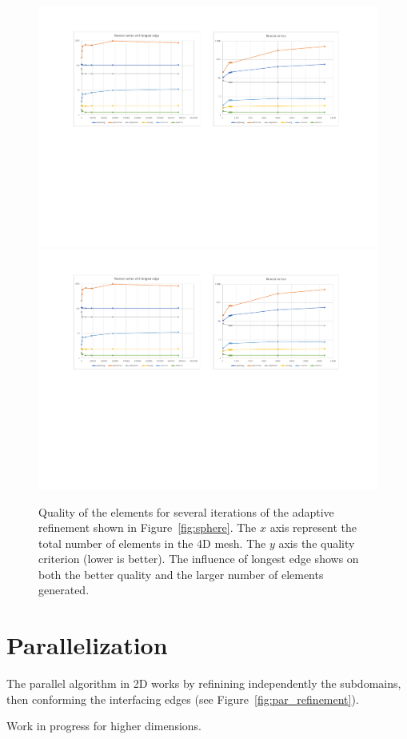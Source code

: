 \documentclass{article}
\begin{document}
\begin{figure}[htbp]
	\centering
	\includegraphics[width=0.48\linewidth]{figures/NewestVertex_Recursive} \hfill
	\includegraphics[width=0.48\linewidth]{figures/NewestVertex_and_LongestEdge_Recursive} 

	\caption{Quality of the elements for several iterations of the adaptive refinement shown in Figure~\ref{fig:sphere}. The $x$ axis represent the total number of elements in the 4D mesh. The $y$ axis the quality criterion (lower is better). The influence of longest edge shows on both the better quality and the larger number of elements generated.}
	\label{fig:quality}
\end{figure}


\section{Parallelization}

The parallel algorithm in 2D works by refinining independently the subdomains, then conforming the 
interfacing edges (see Figure~\ref{fig:par_refinement}). 



Work in progress for higher dimensions.


\end{document}
